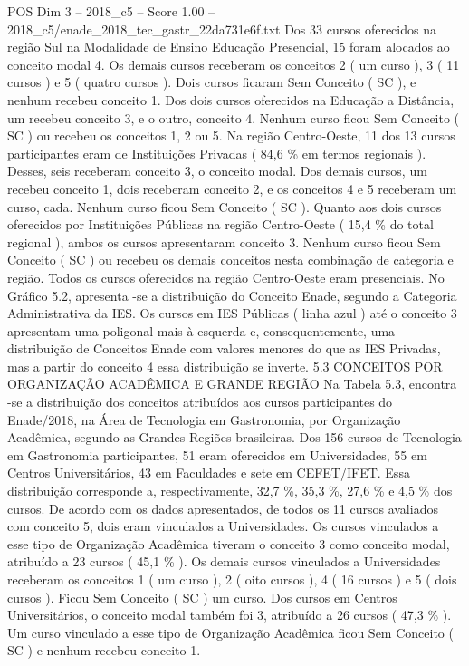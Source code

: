 \begin{textsample}{POS Dim 3 – 2018\_c5 – Score 1.00 – 2018\_c5/enade\_2018\_tec\_gastr\_22da731e6f.txt}
Dos 33 cursos oferecidos na região Sul na Modalidade de Ensino Educação Presencial, 15 foram alocados ao conceito modal 4.
Os demais cursos receberam os conceitos 2 ( um curso ), 3 ( 11 cursos ) e 5 ( quatro cursos ).
Dois cursos ficaram Sem Conceito ( SC ), e nenhum recebeu conceito 1.
Dos dois cursos oferecidos na Educação a Distância, um recebeu conceito 3, e o outro, conceito 4.
Nenhum curso ficou Sem Conceito ( SC ) ou recebeu os conceitos 1, 2 ou 5.
Na região Centro-Oeste, 11 dos 13 cursos participantes eram de Instituições Privadas ( 84,6 \% em termos regionais ).
Desses, seis receberam conceito 3, o conceito modal.
Dos demais cursos, um recebeu conceito 1, dois receberam conceito 2, e os conceitos 4 e 5 receberam um curso, cada.
Nenhum curso ficou Sem Conceito ( SC ).
Quanto aos dois cursos oferecidos por Instituições Públicas na região Centro-Oeste ( 15,4 \% do total regional ), ambos os cursos apresentaram conceito 3.
Nenhum curso ficou Sem Conceito ( SC ) ou recebeu os demais conceitos nesta combinação de categoria e região.
Todos os cursos oferecidos na região Centro-Oeste eram presenciais.
No Gráfico 5.2, apresenta -se a distribuição do Conceito Enade, segundo a Categoria Administrativa da IES.
Os cursos em IES Públicas ( linha azul ) até o conceito 3 apresentam uma poligonal mais à esquerda e, consequentemente, uma distribuição de Conceitos Enade com valores menores do que as IES Privadas, mas a partir do conceito 4 essa distribuição se inverte. 5.3 CONCEITOS POR ORGANIZAÇÃO ACADÊMICA E GRANDE REGIÃO Na Tabela 5.3, encontra -se a distribuição dos conceitos atribuídos aos cursos participantes do Enade/2018, na Área de Tecnologia em Gastronomia, por Organização Acadêmica, segundo as Grandes Regiões brasileiras.
Dos 156 cursos de Tecnologia em Gastronomia participantes, 51 eram oferecidos em Universidades, 55 em Centros Universitários, 43 em Faculdades e sete em CEFET/IFET.
Essa distribuição corresponde a, respectivamente, 32,7 \%, 35,3 \%, 27,6 \% e 4,5 \% dos cursos.
De acordo com os dados apresentados, de todos os 11 cursos avaliados com conceito 5, dois eram vinculados a Universidades.
Os cursos vinculados a esse tipo de Organização Acadêmica tiveram o conceito 3 como conceito modal, atribuído a 23 cursos ( 45,1 \% ).
Os demais cursos vinculados a Universidades receberam os conceitos 1 ( um curso ), 2 ( oito cursos ), 4 ( 16 cursos ) e 5 ( dois cursos ).
Ficou Sem Conceito ( SC ) um curso.
Dos cursos em Centros Universitários, o conceito modal também foi 3, atribuído a 26 cursos ( 47,3 \% ).
Um curso vinculado a esse tipo de Organização Acadêmica ficou Sem Conceito ( SC ) e nenhum recebeu conceito 1.

\end{textsample}
